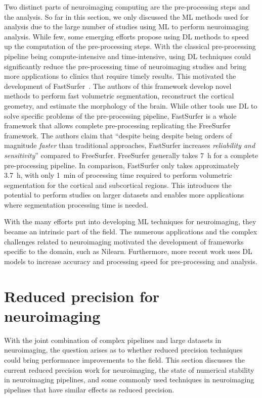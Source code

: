 Two distinct parts of neuroimaging computing are the pre-processing steps and the analysis.
So far in this section, we only discussed the ML methods used for analysis due to
the large number of studies using ML to perform neuroimaging analysis.
While few, some emerging efforts propose using DL methods to speed up the computation of the pre-processing steps.
With the classical pre-processing pipeline being compute-intensive and time-intensive,
using DL techniques could significantly reduce the pre-processing time of neuroimaging
studies and bring more applications to clinics that require timely results.
This motivated the development of FastSurfer~\cite{Henschel2020-vq}.
The authors of this framework develop novel methods to perform fast volumetric
segmentation, reconstruct the cortical geometry, and estimate the morphology of the brain.
While other tools use DL to solve specific problems of the pre-processing pipeline,
FastSurfer is a whole framework that allows complete pre-processing replicating the
FreeSurfer framework.
The authors claim that ``despite being despite being orders of magnitude \textit{faster} than
traditional approaches, FastSurfer increases \textit{reliability and sensitivity}'' compared to FreeSurfer.
FreeSurfer generally takes \SI{7}{\hour} for a complete pre-processing pipeline.
In comparison, FastSurfer only takes approximately \SI{3.7}{\hour}, with only \SI{1}{\minute} of
processing time required to perform volumetric segmentation for the cortical and subcortical regions.
This introduces the potential to perform studies on larger datasets and enables more
applications where segmentation processing time is needed.
	
With the many efforts put into developing ML techniques for neuroimaging, they
became an intrinsic part of the field.
The numerous applications and the complex challenges related to neuroimaging
motivated the development of frameworks specific to the domain, such as Nilearn.
Furthermore, more recent work uses DL models to increase accuracy and processing speed for pre-processing and analysis.
	
\section{Reduced precision for neuroimaging} %
With the joint combination of complex pipelines and large datasets in neuroimaging,
the question arises as to whether reduced precision techniques could bring performance improvements to the field.
This section discusses the current reduced precision work for neuroimaging, the
state of numerical stability in neuroimaging pipelines, and some commonly used
techniques in neuroimaging pipelines that have similar effects as reduced precision.
		

